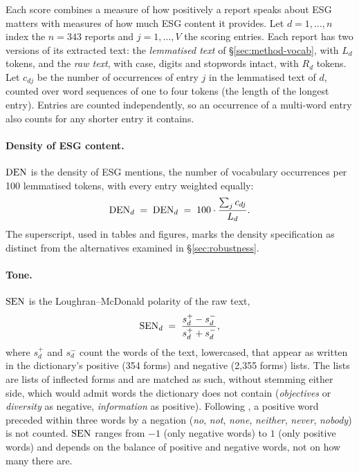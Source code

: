 Each score combines a measure of how positively a report speaks about ESG
matters with measures of how much ESG content it provides. Let $d = 1, \dots,
n$ index the $n = 343$ reports and $j = 1, \dots, V$ the scoring entries. Each
report has two versions of its extracted text: the \emph{lemmatised text} of
\S\ref{sec:method-vocab}, with $L_d$ tokens, and the \emph{raw text}, with
case, digits and stopwords intact, with $R_d$ tokens. Let $c_{dj}$ be the
number of occurrences of entry $j$ in the lemmatised text of $d$, counted over
word sequences of one to four tokens (the length of the longest entry). Entries
are counted independently, so an occurrence of a multi-word entry also counts
for any shorter entry it contains.

\paragraph{Density of ESG content.} $\mathrm{DEN}$ is the density of ESG mentions, the number of
vocabulary occurrences per 100 lemmatised tokens, with every entry weighted
equally:
\[
\mathrm{DEN}_d \;=\; \mathrm{DEN}_d \;=\; 100 \cdot \frac{\sum_{j} c_{dj}}{L_d}.
\]
The superscript, used in tables and figures, marks the density specification
as distinct from the alternatives examined in \S\ref{sec:robustness}.

\paragraph{Tone.} $\mathrm{SEN}$ is the Loughran--McDonald polarity
\citep{loughran2011} of the raw text,
\[
\mathrm{SEN}_d \;=\; \frac{s^{+}_d - s^{-}_d}{s^{+}_d + s^{-}_d},
\]
where $s^{+}_d$ and $s^{-}_d$ count the words of the text, lowercased, that
appear as written in the dictionary's positive (354 forms) and negative (2,355
forms) lists. The lists are lists of inflected forms and are matched as such,
without stemming either side, which would admit words the dictionary does not
contain (\emph{objectives} or \emph{diversity} as negative, \emph{information}
as positive). Following \citet{loughran2011}, a positive word preceded within
three words by a negation (\emph{no}, \emph{not}, \emph{none},
\emph{neither}, \emph{never}, \emph{nobody}) is not counted. $\mathrm{SEN}$ ranges from
$-1$ (only negative words) to $1$ (only positive words) and depends on the
balance of positive and negative words, not on how many there are.

